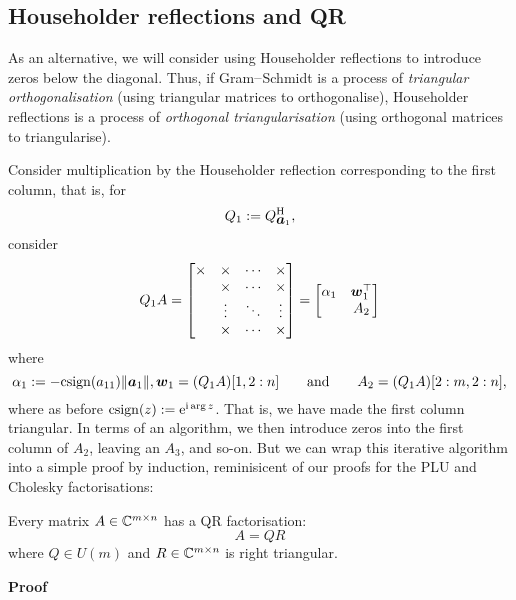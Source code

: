 \subsection{Householder reflections and QR}
As an alternative, we will consider using Householder reflections to introduce zeros below the diagonal. Thus, if Gram\ensuremath{\endash}Schmidt is a process of \emph{triangular orthogonalisation} (using triangular matrices to orthogonalise), Householder reflections is a process of \emph{orthogonal triangularisation}  (using orthogonal matrices to triangularise).

Consider multiplication by the Householder reflection corresponding to the first column, that is, for
\[
Q_1 := Q_{\bm{{\mbox{\boldmath$a$\unboldmath}}}_1}^{\rm H},
\]
consider
\[
Q_1 A = \begin{bmatrix} \ensuremath{\times} & \ensuremath{\times} & \ensuremath{\cdots} & \ensuremath{\times} \\
& \ensuremath{\times} & \ensuremath{\cdots} & \ensuremath{\times} \\
                    & \ensuremath{\vdots} & \ensuremath{\ddots} & \ensuremath{\vdots} \\
                    & \ensuremath{\times} & \ensuremath{\cdots} & \ensuremath{\times} \end{bmatrix} = 
\begin{bmatrix}  \ensuremath{\alpha}_1 & \ensuremath{\bm{\w}}_1^\ensuremath{\top} \\ 
& A_2   \end{bmatrix}
\]
where 
\[
\alpha_1 := -{\rm csign}(a_{11})  \|\bm{{\mbox{\boldmath$a$\unboldmath}}}_1\|, \bm{{\mbox{\boldmath$w$\unboldmath}}}_1 = (Q_1 A)[1, 2:n]  \qquad \hbox{and} \qquad A_2 = (Q_1 A)[2:m, 2:n],
\]
where as before ${\rm csign}(z) :=  {\rm e}^{{\rm i} \arg z}$. That is, we have made the first column triangular. In terms of an algorithm, we then introduce zeros into the first column of $A_2$, leaving an $A_3$, and so-on. But we can wrap this iterative algorithm into a simple proof by induction, reminisicent of our proofs for the PLU and Cholesky factorisations:

\begin{theorem}[QR]  Every matrix $A \in {\mathbb C}^{m \times n}$ has a QR factorisation:
\[
A = QR
\]
where $Q \ensuremath{\in} U(m)$ and $R \in {\mathbb C}^{m \times n}$ is right triangular.

\end{theorem}
\textbf{Proof}

